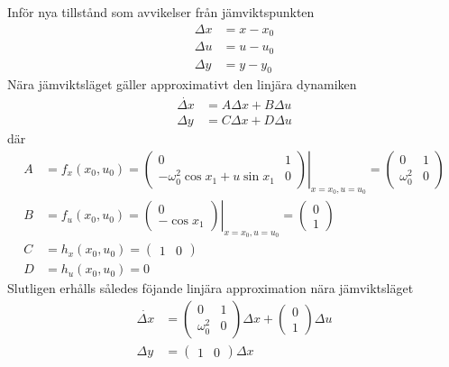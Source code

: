 \documentclass[12pt]{article}
\begin{document}
Inför nya tillstånd som avvikelser från jämviktspunkten
\begin{align*}
  \Delta x &= x - x_0 \\
  \Delta u &= u - u_0 \\
  \Delta y &= y - y_0
\end{align*}
Nära jämviktsläget gäller approximativt den linjära dynamiken
\begin{align*}
  \dot{\Delta x} &= A\Delta x + B\Delta u \\
  \Delta y &= C\Delta x + D \Delta u
\end{align*}
där
\begin{align*}
  A &= f_x(x_0,u_0) =
  \left.\begin{pmatrix}
    0 & 1 \\
    -\omega_0^2\cos{x_1} + u\sin{x_1} & 0
  \end{pmatrix}\right|_{x = x_0, u = u_0} =
                                        \begin{pmatrix}
                                          0 & 1 \\
                                          \omega_0^2 & 0
                                        \end{pmatrix} \\
  B &= f_u(x_0, u_0) =
      \left.\begin{pmatrix}
        0 \\
        -\cos{x_1}
      \end{pmatrix}\right|_{x = x_0, u = u_0} =
  \begin{pmatrix}
    0 \\
    1
  \end{pmatrix} \\
  C &= h_x(x_0,u_0) =
      \begin{pmatrix}
        1 & 0
      \end{pmatrix} \\
  D &= h_u(x_0,u_0) = 0
\end{align*}
Slutligen erhålls således föjande linjära approximation nära jämviktsläget
\begin{align*}
  \dot{\Delta x} &=
                   \begin{pmatrix}
                     0 & 1 \\
                     \omega_0^2 & 0
                   \end{pmatrix}\Delta x +
                                  \begin{pmatrix}
                                    0 \\
                                    1
                                  \end{pmatrix}\Delta u \\
  \Delta y &=
             \begin{pmatrix}
               1 & 0
             \end{pmatrix}\Delta x
\end{align*}
\end{document}
